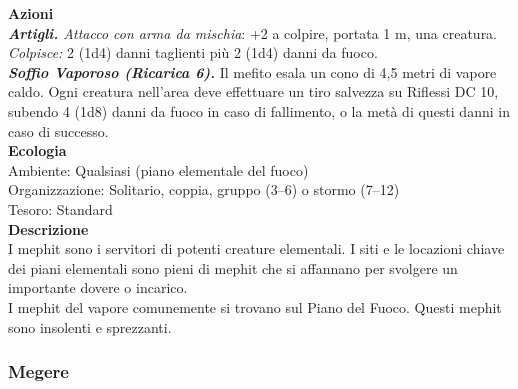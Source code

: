 \begin{multicols}{2}
\smallskip\textbf{Azioni}\\
\emph{\textbf{Artigli.} Attacco con arma da mischia}: +2 a colpire, portata 1 m, una creatura.\\
\emph{Colpisce:} 2 (1d4) danni taglienti più 2 (1d4) danni da fuoco.\\
\emph{\textbf{Soffio Vaporoso (Ricarica 6).}} Il mefito esala un cono di 4,5 metri di vapore caldo. Ogni creatura nell'area deve effettuare un tiro salvezza su Riflessi DC 10, subendo 4 (1d8) danni da fuoco in caso di fallimento, o la metà di questi danni in caso di successo.\\
\textbf{Ecologia}\\
Ambiente: Qualsiasi (piano elementale del fuoco)\\
Organizzazione: Solitario, coppia, gruppo (3–6) o stormo (7–12)\\
Tesoro: Standard\\
\textbf{Descrizione}\\
I mephit sono i servitori di potenti creature elementali. I siti e le locazioni chiave dei piani elementali sono pieni di mephit che si affannano per svolgere un importante dovere o incarico.\\
I mephit del vapore comunemente si trovano sul Piano del Fuoco. Questi mephit sono insolenti e sprezzanti.\\

\subsubsection{Megere}


\end{multicols}
